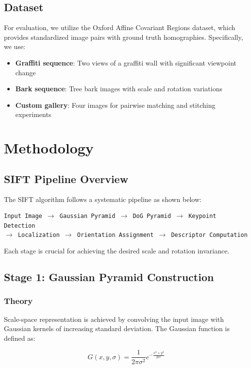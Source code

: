 \documentclass[12pt,a4paper]{article}
\begin{document}
\subsection{Dataset}
For evaluation, we utilize the Oxford Affine Covariant Regions dataset, which provides standardized image pairs with ground truth homographies. Specifically, we use:
\begin{itemize}
    \item \textbf{Graffiti sequence}: Two views of a graffiti wall with significant viewpoint change
    \item \textbf{Bark sequence}: Tree bark images with scale and rotation variations
    \item \textbf{Custom gallery}: Four images for pairwise matching and stitching experiments
\end{itemize}

\section{Methodology}

\subsection{SIFT Pipeline Overview}
The SIFT algorithm follows a systematic pipeline as shown below:

\begin{center}
\texttt{Input Image $\rightarrow$ Gaussian Pyramid $\rightarrow$ DoG Pyramid $\rightarrow$ Keypoint Detection}\\
\texttt{$\rightarrow$ Localization $\rightarrow$ Orientation Assignment $\rightarrow$ Descriptor Computation}
\end{center}

Each stage is crucial for achieving the desired scale and rotation invariance.

\subsection{Stage 1: Gaussian Pyramid Construction}

\subsubsection{Theory}
Scale-space representation is achieved by convolving the input image with Gaussian kernels of increasing standard deviation. The Gaussian function is defined as:

\begin{equation}
G(x, y, \sigma) = \frac{1}{2\pi\sigma^2} e^{-\frac{x^2+y^2}{2\sigma^2}}
\end{equation}
\end{document}
